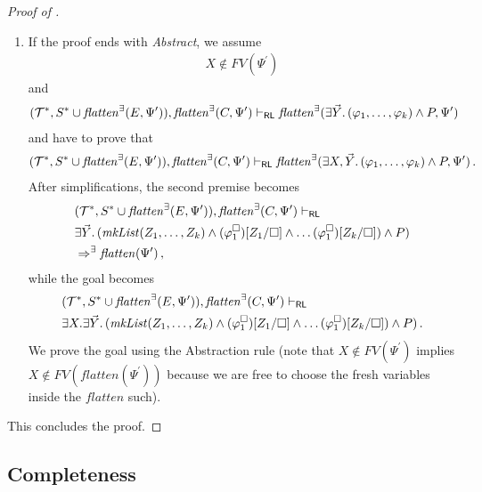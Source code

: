 \begin{proof}[Proof of ]
\begin{enumerate}
        
    \item If the proof ends with \emph{Abstract},
    we assume
    \begin{align*}
        X \not\in \mathit{FV}(\Psi^\prime)
    \end{align*}
    and
    \begin{align*}
                (\mathcal{T}^*, S^* \cup \mathit{flatten}^\exists(E, \Psi^\prime)), \mathit{flatten}^\exists(C, \Psi^\prime) \vdash_{\mathsf{RL}}
          \mathit{flatten}^\exists(\exists \vec{Y}.\, (\varphi_1, \ldots, \varphi_k) \land P, \Psi^\prime)
    \end{align*}
    and have to prove that
    \begin{align*}
                (\mathcal{T}^*, S^* \cup \mathit{flatten}^\exists(E, \Psi^\prime)), \mathit{flatten}^\exists(C, \Psi^\prime) \vdash_{\mathsf{RL}}
          \mathit{flatten}^\exists(\exists X,\vec{Y}.\, (\varphi_1, \ldots, \varphi_k) \land P, \Psi^\prime) \, .
    \end{align*}
    After simplifications, the second premise becomes
    \begin{align*}
            &(\mathcal{T}^*, S^* \cup \mathit{flatten}^\exists(E, \Psi^\prime)), \mathit{flatten}^\exists(C, \Psi^\prime) \vdash_{\mathsf{RL}}
          \\& \exists \vec{Y}.\, (\mathit{mkList}(Z_1, \ldots, Z_k) \land (\varphi_1^\square)[Z_1/\square] \land \ldots (\varphi_1^\square)[Z_k/\square]) \land P)
          \\&
          \Rightarrow^\exists \mathit{flatten}(\Psi^\prime) \, ,
    \end{align*}
    while the goal becomes
    \begin{align*}
          &(\mathcal{T}^*, S^* \cup \mathit{flatten}^\exists(E, \Psi^\prime)), \mathit{flatten}^\exists(C, \Psi^\prime) \vdash_{\mathsf{RL}}
          \\&\exists X. \exists \vec{Y}.\, (\mathit{mkList}(Z_1, \ldots, Z_k) \land (\varphi_1^\square)[Z_1/\square] \land \ldots (\varphi_1^\square)[Z_k/\square]) \land P) \, .
    \end{align*}
    We prove the goal using the Abstraction rule
    (note that $X \not\in \mathit{FV}(\Psi^\prime)$ implies $X \not\in \mathit{FV}(\mathit{flatten}(\Psi^\prime))$
    because we are free to choose the fresh variables inside the $\mathit{flatten}$ such).
    \end{enumerate}
    This concludes the proof.
\end{proof}


\subsection{Completeness}\label{app:completeness}

